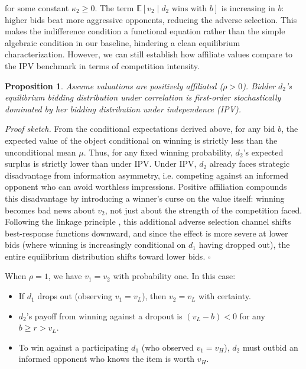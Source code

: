 \documentclass[11pt]{article}
\theoremstyle{plain}
\theoremstyle{definition}
\theoremstyle{plain}
\theoremstyle{plain}
\theoremstyle{plain}
\theoremstyle{plain}
\newtheorem{prop}[thm]{Proposition}
\numberwithin{equation}{section}
\begin{document}
\noindent for some constant $\kappa_2 \geq 0$. The term $\mathbb{E}[v_2 \mid d_2 \text{ wins with } b]$ is increasing in $b$: higher bids beat more aggressive opponents, reducing the adverse selection. This makes the indifference condition a functional equation rather than the simple algebraic condition in our baseline, hindering a clean equilibrium characterization. However, we can still establish how affiliate values compare to the IPV benchmark in terms of competition intensity.

\vspace{0.3cm}

\begin{prop}\label{prop:correlation-direction}
Assume valuations are positively affiliated ($\rho > 0$). Bidder $d_2$'s equilibrium bidding distribution under correlation is first-order stochastically dominated by her bidding distribution under independence (IPV).
\end{prop}

\noindent \emph{Proof sketch.} From the conditional expectations derived above, for any bid $b$, the expected value of the object conditional on winning is strictly less than the unconditional mean $\mu$. Thus, for any fixed winning probability, $d_2$'s expected surplus is strictly lower than under IPV. Under IPV, $d_2$ already faces strategic disadvantage from information asymmetry, i.e. competing against an informed opponent who can avoid worthless impressions. Positive affiliation compounds this disadvantage by introducing a winner's curse on the value itself: winning becomes bad news about $v_2$, not just about the strength of the competition faced. Following the linkage principle \parencite{milgromTheoryAuctionsCompetitive1982}, this additional adverse selection channel shifts best-response functions downward, and since the effect is more severe at lower bids (where winning is increasingly conditional on $d_1$ having dropped out), the entire equilibrium distribution shifts toward lower bids. \hfill $\square$

\vspace{0.2cm}

\noindent When $\rho = 1$, we have $v_1 = v_2$ with probability one. In this case:
\begin{itemize}
    \item If $d_1$ drops out (observing $v_1 = v_L$), then $v_2 = v_L$ with certainty.
    \item $d_2$'s payoff from winning against a dropout is $(v_L - b) < 0$ for any $b \geq r > v_L$.
    \item To win against a participating $d_1$ (who observed $v_1 = v_H$), $d_2$ must outbid an informed opponent who knows the item is worth $v_H$.
\end{itemize}
\end{document}
